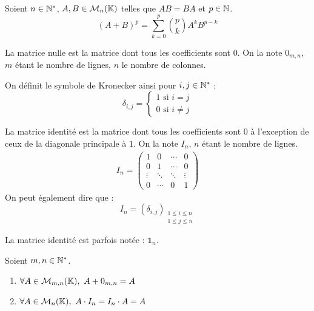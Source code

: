 \begin{proposition}
	Soient $n \in \mathbb{N}^*$, $A, B \in \mathcal{M}_n(\mathbb{K})$ telles que $AB = BA$ et $p \in \mathbb{N}$.
	\[ (A + B)^p = \sum_{k = 0}^{p} \binom{p}{k} A^k B^{p-k} \]
\end{proposition}

\begin{definition}
	La matrice nulle est la matrice dont tous les coefficients sont $0$. On la note $0_{m,n}$, $m$ étant le nombre de lignes, $n$ le nombre de colonnes. 
\end{definition}

\begin{definition}
	On définit le symbole de Kronecker ainsi pour $i, j \in \mathbb{N}^*$ :
	\[ \delta_{i,j} = 
	\begin{cases}
		1 \text{ si } i = j \\
		0 \text{ si } i \neq j
	\end{cases}
	\]
\end{definition}

\begin{definition}
	La matrice identité est la matrice dont tous les coefficients sont $0$ à l'exception de ceux de la diagonale principale à $1$. On la note $I_n$, $n$ étant le nombre de lignes.
	\begin{align*}
		I_n = 
		\begin{pmatrix}
			1 & 0 & \cdots & 0 \\
			0 & 1 & \cdots & 0 \\
			\vdots & \ddots & \ddots & \vdots \\
			0 & \cdots & 0 & 1
		\end{pmatrix}
	\end{align*}
	On peut également dire que :
	\[ I_n = (\delta_{i,j})_{\substack{1 \leq i \leq n \\ 1 \leq j \leq n}} \]
\end{definition}

\begin{remark}
    La matrice identité est parfois notée : $\mathds{1}_n$.
\end{remark}

\begin{lemma}
	Soient $m,n \in \mathbb{N}^*$.
	\begin{multicols}{2}
	    \begin{enumerate}
    		\item $\forall A \in \mathcal{M}_{m, n}(\K),\ A + 0_{m,n} = A$
    		\item $\forall A \in \mathcal{M}_{n}(\mathbb{K}),\ A \cdot I_n = I_n \cdot A = A$
    	\end{enumerate}
	\end{multicols}
\end{lemma}

